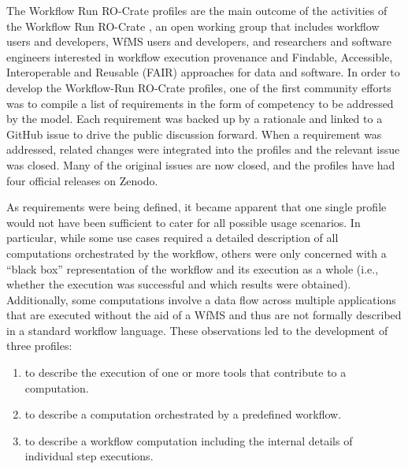 The Workflow Run RO-Crate profiles are the main outcome of the activities of the Workflow Run RO-Crate , an open working group that includes workflow users and developers, WfMS users and developers, and researchers and software engineers interested in workflow execution provenance and Findable, Accessible, Interoperable and Reusable (FAIR) approaches for data and software.
In order to develop the Workflow-Run RO-Crate profiles, one of the first community efforts was to compile a list of requirements in the form of competency  to be addressed by the model.
Each requirement was backed up by a rationale and linked to a GitHub issue to drive the public discussion forward. When a requirement was addressed, related changes were integrated into the profiles and the relevant issue was closed. Many of the original issues are now closed, and the profiles have had four official releases on Zenodo.


As requirements were being defined, it became apparent that one single profile would not have been sufficient to cater for all possible usage scenarios.
In particular, while some use cases required a detailed description of all computations orchestrated by the workflow, others were only concerned with a ``black box'' representation of the workflow and its execution as a whole (i.e., whether the execution was successful and which results were obtained).
Additionally, some computations involve a data flow across multiple applications that are executed without the aid of a WfMS and thus are not formally described in a standard workflow language.
These observations led to the development of three profiles: 

\begin{enumerate}[(1)]
  \item {}
  to describe the execution of one or more tools that contribute to a computation.
  \item {}
  to describe a computation orchestrated by a predefined workflow.
  \item {}
  to describe a workflow computation including the internal details of individual step executions.
\end{enumerate}

